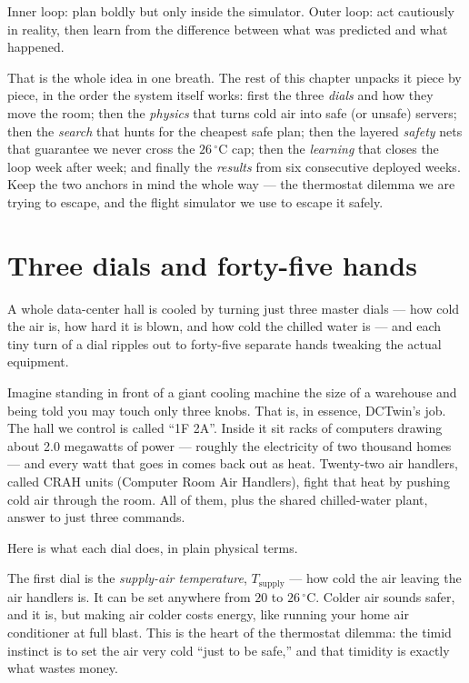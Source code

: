 \begin{keyidea}
Inner loop: plan boldly but only inside the simulator. Outer loop: act cautiously in reality, then learn from the difference between what was predicted and what happened.
\end{keyidea}

That is the whole idea in one breath. The rest of this chapter unpacks it piece by piece, in the order the system itself works: first the three \emph{dials} and how they move the room; then the \emph{physics} that turns cold air into safe (or unsafe) servers; then the \emph{search} that hunts for the cheapest safe plan; then the layered \emph{safety} nets that guarantee we never cross the $26\,^\circ\mathrm{C}$ cap; then the \emph{learning} that closes the loop week after week; and finally the \emph{results} from six consecutive deployed weeks. Keep the two anchors in mind the whole way --- the thermostat dilemma we are trying to escape, and the flight simulator we use to escape it safely.

\section{Three dials and forty-five hands}

\begin{keyidea}
A whole data-center hall is cooled by turning just three master dials --- how cold the air is, how hard it is blown, and how cold the chilled water is --- and each tiny turn of a dial ripples out to forty-five separate hands tweaking the actual equipment.
\end{keyidea}

Imagine standing in front of a giant cooling machine the size of a warehouse and being told you may touch only three knobs. That is, in essence, DCTwin's job. The hall we control is called ``1F 2A''. Inside it sit racks of computers drawing about 2.0 megawatts of power --- roughly the electricity of two thousand homes --- and every watt that goes in comes back out as heat. Twenty-two air handlers, called CRAH units (Computer Room Air Handlers), fight that heat by pushing cold air through the room. All of them, plus the shared chilled-water plant, answer to just three commands.

Here is what each dial does, in plain physical terms.

The first dial is the \emph{supply-air temperature}, $T_{\text{supply}}$ --- how cold the air leaving the air handlers is. It can be set anywhere from $20$ to $26\,^\circ$C. Colder air sounds safer, and it is, but making air colder costs energy, like running your home air conditioner at full blast. This is the heart of the thermostat dilemma: the timid instinct is to set the air very cold ``just to be safe,'' and that timidity is exactly what wastes money.

